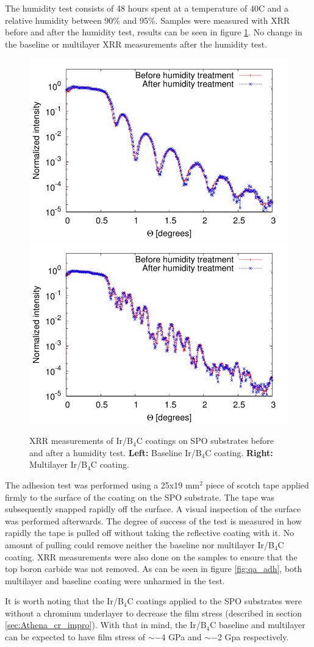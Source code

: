 The humidity test consists of 48 hours spent at a temperature of 40\degr C and a relative humidity between 90\% and 95\%. Samples were measured with XRR before and after the humidity test, results can be seen in figure \ref{fig:qa_hum}. No change in the baseline or multilayer XRR measurements after the humidity test.

\begin{figure}[!h]
  \center  \includegraphics[width=0.47\linewidth]{figures/athena/coating_on_spo/123-11-09_hum_2.pdf}
  \includegraphics[width=0.47\linewidth]{figures/athena/coating_on_spo/120-09-26_hum_2.pdf}
\caption{\footnotesize XRR measurements of Ir/B$_4$C coatings on SPO substrates before and after a humidity test. \textbf{Left:} Baseline Ir/B$_4$C coating. \textbf{Right:} Multilayer Ir/B$_4$C coating.}\label{fig:qa_hum}
\end{figure}

The adhesion test was performed using a 25x19 mm$^2$ piece of scotch tape applied firmly to the surface of the coating on the SPO substrate. The tape was subsequently snapped rapidly off the surface. A visual inspection of the surface was performed afterwards. The degree of success of the test is measured in how rapidly the tape is pulled off without taking the reflective coating with it. No amount of pulling could remove neither the baseline nor multilayer Ir/B$_4$C coating. XRR measurements were also done on the samples to ensure that the top boron carbide was not removed. As can be seen in figure \ref{fig:qa_adh}, both multilayer and baseline coating were unharmed in the test.

It is worth noting that the Ir/B$_4$C coatings applied to the SPO substrates were without a chromium underlayer to decrease the film stress (described in section \ref{sec:Athena_cr_impro}). With that in mind, the Ir/B$_4$C baseline and multilayer can be expected to have film stress of $\sim-$4 GPa and $\sim-$2 Gpa respectively.

